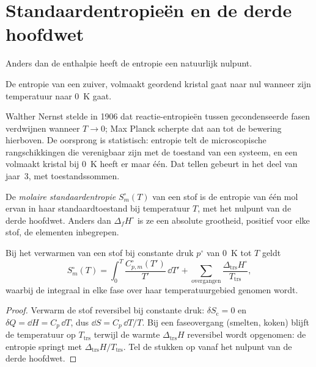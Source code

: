 \section{Standaardentropieën en de derde hoofdwet}

Anders dan de enthalpie heeft de entropie een natuurlijk nulpunt.

\begin{theorem}\label{thm:b2:reaction-free-energy:third-law}
De entropie van een zuiver, volmaakt geordend kristal gaat naar nul wanneer zijn
temperatuur naar \qty{0}{K} gaat.
\end{theorem}
\admitted

\begin{remark}\label{rem:b2:reaction-free-energy:third-law}
Walther Nernst stelde in 1906 dat reactie-entropieën tussen gecondenseerde
fasen verdwijnen wanneer $T \to 0$; Max Planck scherpte dat aan tot de bewering
hierboven. De oorsprong is statistisch: entropie telt de microscopische
rangschikkingen die verenigbaar zijn met de toestand van een systeem, en een volmaakt kristal
bij \qty{0}{K} heeft er maar één. Dat tellen gebeurt in het deel van jaar~3,
met toestandssommen.
\end{remark}

\begin{definition}\label{def:b2:reaction-free-energy:standard-entropy}
De \emph{molaire standaardentropie}
$S^\circ_m(T)$ van een stof is de entropie van één mol ervan in haar
standaardtoestand bij temperatuur $T$, met het nulpunt van de derde hoofdwet.
Anders dan $\Delta_f H^\circ$ is ze een absolute grootheid, positief voor elke
stof, de elementen inbegrepen.
\end{definition}

\begin{proposition}\label{prop:b2:reaction-free-energy:absolute-entropy}
Bij het verwarmen van een stof bij constante druk $p^\circ$ van \qty{0}{K} tot $T$ geldt
\[
  S^\circ_m(T) = \int_0^T\frac{C^\circ_{p,m}(T')}{T'}\,\dd T' +
  \sum_{\text{overgangen}}\frac{\Delta_{\text{trs}}H^\circ}{T_{\text{trs}}} ,
\]
waarbij de integraal in elke fase over haar temperatuurgebied genomen wordt.
\end{proposition}

\begin{proof}
Verwarm de stof reversibel bij constante druk: $\delta S_{\text{c}} =
0$ en $\delta Q = \dd H = C_p\,\dd T$, dus $\dd S = C_p\,\dd T/T$. Bij een
faseovergang (smelten, koken) blijft de temperatuur op $T_{\text{trs}}$
terwijl de warmte $\Delta_{\text{trs}}H$ reversibel wordt opgenomen: de entropie
springt met $\Delta_{\text{trs}}H/T_{\text{trs}}$. Tel de stukken op vanaf het
nulpunt van de derde hoofdwet.
\end{proof}

